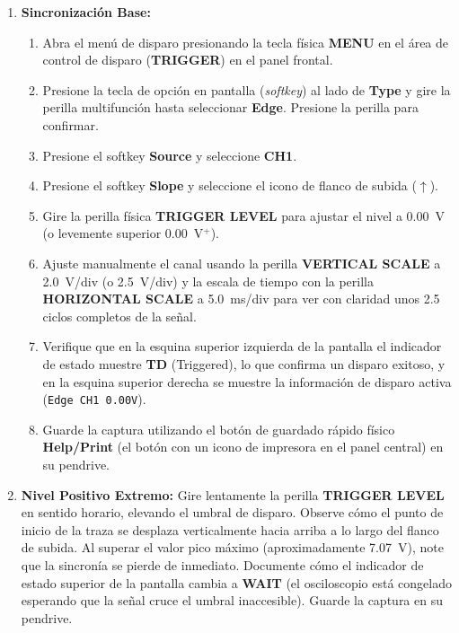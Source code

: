 \documentclass[12pt, letterpaper]{article}
\begin{document}
\begin{enumerate}[label=\textbf{2.2.\alph*)}]
    \item \textbf{Sincronización Base:} 
    \begin{enumerate}[label=\roman*.]
        \item Abra el menú de disparo presionando la tecla física \textbf{MENU} en el área de control de disparo (\textbf{TRIGGER}) en el panel frontal.
        \item Presione la tecla de opción en pantalla (\textit{softkey}) al lado de \textbf{Type} y gire la perilla multifunción hasta seleccionar \textbf{Edge}. Presione la perilla para confirmar.
        \item Presione el softkey \textbf{Source} y seleccione \textbf{CH1}.
        \item Presione el softkey \textbf{Slope} y seleccione el icono de flanco de subida ($\uparrow$).
        \item Gire la perilla física \textbf{TRIGGER LEVEL} para ajustar el nivel a \SI{0.00}{\volt} (o levemente superior \SI{0.00}{\volt}$^+$).
        \item Ajuste manualmente el canal usando la perilla \textbf{VERTICAL SCALE} a \SI{2.0}{V/div} (o \SI{2.5}{V/div}) y la escala de tiempo con la perilla \textbf{HORIZONTAL SCALE} a \SI{5.0}{ms/div} para ver con claridad unos 2.5 ciclos completos de la señal.
        \item Verifique que en la esquina superior izquierda de la pantalla el indicador de estado muestre \textbf{TD} (Triggered), lo que confirma un disparo exitoso, y en la esquina superior derecha se muestre la información de disparo activa (\texttt{Edge \quad CH1 \quad 0.00V}).
        \item Guarde la captura utilizando el botón de guardado rápido físico \textbf{Help/Print} (el botón con un icono de impresora en el panel central) en su pendrive.
    \end{enumerate}
    
    \item \textbf{Nivel Positivo Extremo:} Gire lentamente la perilla \textbf{TRIGGER LEVEL} en sentido horario, elevando el umbral de disparo. Observe cómo el punto de inicio de la traza se desplaza verticalmente hacia arriba a lo largo del flanco de subida. Al superar el valor pico máximo (aproximadamente \SI{7.07}{\volt}), note que la sincronía se pierde de inmediato. Documente cómo el indicador de estado superior de la pantalla cambia a \textbf{WAIT} (el osciloscopio está congelado esperando que la señal cruce el umbral inaccesible). Guarde la captura en su pendrive.
    

\end{enumerate}
\end{document}
